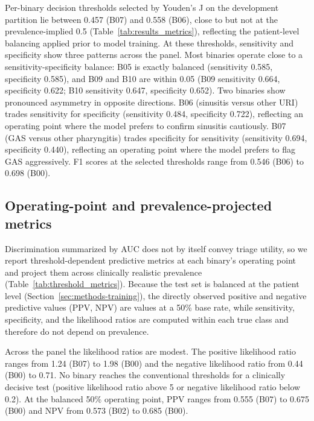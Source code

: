 \documentclass[utf8]{FrontiersinHarvard} %
\begin{document}
Per-binary decision thresholds selected by Youden's J on the development partition lie between 0.457 (B07) and 0.558 (B06), close to but not at the prevalence-implied 0.5 (Table~\ref{tab:results_metrics}), reflecting the patient-level balancing applied prior to model training. At these thresholds, sensitivity and specificity show three patterns across the panel. Most binaries operate close to a sensitivity-specificity balance: B05 is exactly balanced (sensitivity 0.585, specificity 0.585), and B09 and B10 are within 0.05 (B09 sensitivity 0.664, specificity 0.622; B10 sensitivity 0.647, specificity 0.652). Two binaries show pronounced asymmetry in opposite directions. B06 (sinusitis versus other URI) trades sensitivity for specificity (sensitivity 0.484, specificity 0.722), reflecting an operating point where the model prefers to confirm sinusitis cautiously. B07 (GAS versus other pharyngitis) trades specificity for sensitivity (sensitivity 0.694, specificity 0.440), reflecting an operating point where the model prefers to flag GAS aggressively. F1 scores at the selected thresholds range from 0.546 (B06) to 0.698 (B00).

\subsection{Operating-point and prevalence-projected metrics}
\label{sec:results-clinical}

Discrimination summarized by AUC does not by itself convey triage utility, so we report threshold-dependent predictive metrics at each binary's operating point and project them across clinically realistic prevalence (Table~\ref{tab:threshold_metrics}). Because the test set is balanced at the patient level (Section~\ref{sec:methods-training}), the directly observed positive and negative predictive values (PPV, NPV) are values at a 50\% base rate, while sensitivity, specificity, and the likelihood ratios are computed within each true class and therefore do not depend on prevalence.

Across the panel the likelihood ratios are modest. The positive likelihood ratio ranges from 1.24 (B07) to 1.98 (B00) and the negative likelihood ratio from 0.44 (B00) to 0.71. No binary reaches the conventional thresholds for a clinically decisive test (positive likelihood ratio above 5 or negative likelihood ratio below 0.2). At the balanced 50\% operating point, PPV ranges from 0.555 (B07) to 0.675 (B00) and NPV from 0.573 (B02) to 0.685 (B00).
\end{document}
